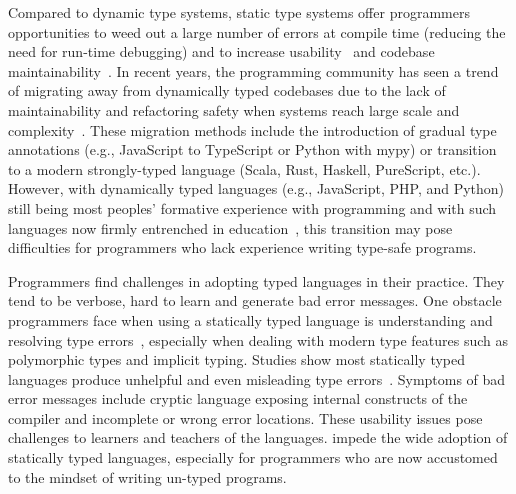 


Compared to dynamic type systems, static type systems offer programmers opportunities to weed out a large number of errors at compile time (reducing the need for run-time debugging) and to increase usability~\cite{mayer_static_2012} and codebase maintainability~\cite{kleinschmager_static_2012}. In recent years, the programming community has seen a trend of migrating away from dynamically typed codebases due to the lack of maintainability and refactoring safety when systems reach large scale and complexity~\cite{chatley_next_2019}. These migration methods include the introduction of gradual type annotations (e.g., JavaScript to TypeScript or Python with mypy) or transition to a modern strongly-typed language (Scala, Rust, Haskell, PureScript, etc.). However, with dynamically typed languages (e.g., JavaScript, PHP, and Python) still being most peoples' formative experience with programming and with such languages now firmly entrenched in education~\cite{stackoverflow_stack_2022}, this transition may pose difficulties for programmers who lack experience writing type-safe programs.

Programmers find challenges in adopting typed languages in their practice. They tend to be verbose, hard to learn and generate bad error messages. 
One obstacle programmers face when using a statically typed language is understanding and resolving type errors~\cite{marceau_measuring_2011, tirronen_understanding_2015}, especially when dealing with modern type features such as polymorphic types and implicit typing. Studies show most statically typed languages produce unhelpful and even misleading type errors~\cite{}. Symptoms of bad error messages include cryptic language exposing internal constructs of the compiler and incomplete or wrong error locations. These usability issues pose challenges to learners and teachers of the languages. impede the wide adoption of statically typed languages, especially for programmers who are now accustomed to the mindset of writing un-typed programs.

